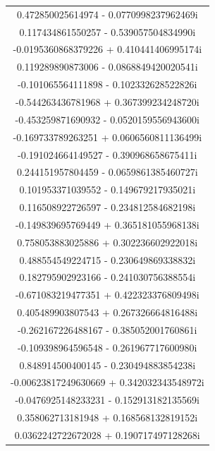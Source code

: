 \documentclass[12pt,a4paper,UTF8]{ctexart}
\begin{document}
\begin{enumerate}
\begin{longtable}{c}
              0.472850025614974      -   0.0770998237962469i  \\
              0.117434861550257      -   0.539057504834990i   \\
              -0.0195360868379226    +   0.410441406995174i   \\
              0.119289890873006      -   0.0868849420020541i  \\
              -0.101065564111898     -   0.102332628522826i   \\
              -0.544263436781968     +   0.367399234248720i   \\
              -0.453259871690932     -   0.0520159556943600i  \\
              -0.169733789263251     +   0.0606560811136499i  \\
              -0.191024664149527     -   0.390968658675411i   \\
              0.244151957804459      -   0.0659861385460727i  \\
              0.101953371039552      -   0.149679217935021i   \\
              0.116508922726597      -   0.234812584682198i   \\
              -0.149839695769449     +   0.365181055968138i   \\
              0.758053883025886      +   0.302236602922018i   \\
              0.488554549224715      -   0.230649869338832i   \\
              0.182795902923166      -   0.241030756388554i   \\
              -0.671083219477351     +   0.422323376809498i   \\
              0.405489903807543      +   0.267326664816488i   \\
              -0.262167226488167     -   0.385052001760861i   \\
              -0.109398964596548     -   0.261967717600980i   \\
              0.848914500400145      -   0.230494883854238i   \\
              -0.00623817249630669   +   0.342032343548972i   \\
              -0.0476925148233231    -   0.152913182135569i   \\
              0.358062713181948      +   0.168568132819152i   \\
              0.0362242722672028     +   0.190717497128268i   \\

\end{longtable}
\end{enumerate}
\end{document}
